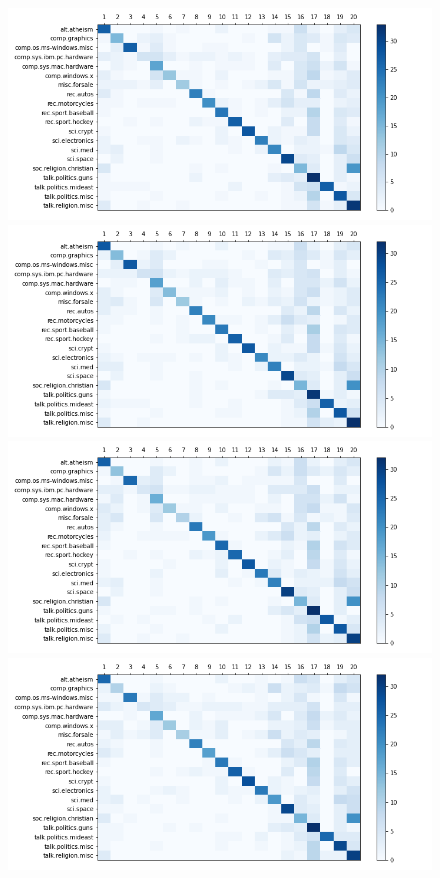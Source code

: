\documentclass[12pt]{article}
\begin{document}
\begin{enumerate}[label=(\alph*)]
\begin{figure}[!ht]
      \includegraphics[scale=0.2]{figures/local_sensitivity_hashing_l=128_d=9.png}
      \includegraphics[scale=0.2]{figures/local_sensitivity_hashing_l=128_d=10.png}
      \includegraphics[scale=0.2]{figures/local_sensitivity_hashing_l=128_d=11.png}
      \includegraphics[scale=0.2]{figures/local_sensitivity_hashing_l=128_d=12.png}

\end{figure}
\end{enumerate}
\end{document}

